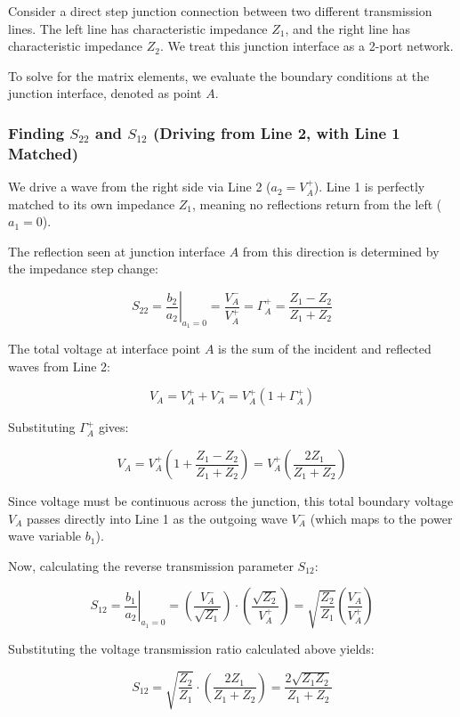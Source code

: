 \documentclass[
]{article}
\begin{document}
Consider a direct step junction connection between two different
transmission lines. The left line has characteristic impedance \(Z_1\),
and the right line has characteristic impedance \(Z_2\). We treat this
junction interface as a 2-port network.

To solve for the matrix elements, we evaluate the boundary conditions at
the junction interface, denoted as point \(A\).

\subsubsection{\texorpdfstring{Finding \(S_{22}\) and \(S_{12}\)
(Driving from Line 2, with Line 1
Matched)}{Finding S\_\{22\} and S\_\{12\} (Driving from Line 2, with Line 1 Matched)}}\label{finding-s_22-and-s_12-driving-from-line-2-with-line-1-matched}

We drive a wave from the right side via Line 2 (\(a_2 = V_A^+\)). Line 1
is perfectly matched to its own impedance \(Z_1\), meaning no
reflections return from the left (\(a_1 = 0\)).

The reflection seen at junction interface \(A\) from this direction is
determined by the impedance step change:

\[S_{22} = \left. \frac{b_2}{a_2} \right|_{a_1=0} = \frac{V_A^-}{V_A^+} = \Gamma_A^+ = \frac{Z_1 - Z_2}{Z_1 + Z_2}\]

The total voltage at interface point \(A\) is the sum of the incident
and reflected waves from Line 2:

\[V_A = V_A^+ + V_A^- = V_A^+(1 + \Gamma_A^+)\]

Substituting \(\Gamma_A^+\) gives:

\[V_A = V_A^+ \left( 1 + \frac{Z_1 - Z_2}{Z_1 + Z_2} \right) = V_A^+ \left( \frac{2Z_1}{Z_1 + Z_2} \right)\]

Since voltage must be continuous across the junction, this total
boundary voltage \(V_A\) passes directly into Line 1 as the outgoing
wave \(V_A^-\) (which maps to the power wave variable \(b_1\)).

Now, calculating the reverse transmission parameter \(S_{12}\):

\[S_{12} = \left. \frac{b_1}{a_2} \right|_{a_1=0} = \left( \frac{V_A^-}{\sqrt{Z_1}} \right) \cdot \left( \frac{\sqrt{Z_2}}{V_A^+} \right) = \sqrt{\frac{Z_2}{Z_1}} \left( \frac{V_A^-}{V_A^+} \right)\]

Substituting the voltage transmission ratio calculated above yields:

\[S_{12} = \sqrt{\frac{Z_2}{Z_1}} \cdot \left( \frac{2Z_1}{Z_1 + Z_2} \right) = \frac{2\sqrt{Z_1 Z_2}}{Z_1 + Z_2}\]
\end{document}
